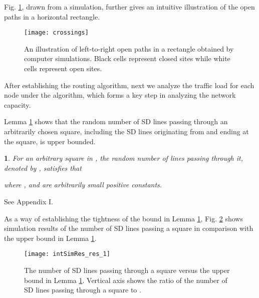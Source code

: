 \documentclass[english]{IEEEtran}
\theoremstyle{plain}
\theoremstyle{plain}
\theoremstyle{plain}
\newtheorem{lem}[thm]{\protect\lemmaname}
\theoremstyle{remark}
\providecommand{\lemmaname}{Lemma}
\begin{document}
Fig. \ref{fig:Open paths}, drawn from a simulation, further gives
an intuitive illustration of the open paths in a horizontal rectangle. 

\begin{figure}
\begin{centering}
\texttt{[image: crossings]}
\par\end{centering}

\protect\caption{\label{fig:Open paths}An illustration of left-to-right open paths
in a rectangle obtained by computer simulations. Black cells represent
closed sites while white cells represent open sites. }


\end{figure}


After establishing the routing algorithm, next we analyze the traffic
load for each node under the algorithm, which forms a key step in
analyzing the network capacity.

Lemma \ref{lem:number of SD lines intersecting any square} shows
that the random number of SD lines passing through an arbitrarily
chosen square, including the SD lines originating from and ending
at the square, is upper bounded. 
\begin{lem}
\label{lem:number of SD lines intersecting any square}For an arbitrary
square in , the random number of  lines passing through
it, denoted by , satisfies that

where ,
 and  are arbitrarily small positive constants.\end{lem}
\begin{IEEEproof}
See Appendix I.
\end{IEEEproof}
As a way of establishing the tightness of the bound in Lemma \ref{lem:number of SD lines intersecting any square},
Fig. \ref{fig:number of SD lines} shows simulation results of the
number of SD lines passing a square in comparison with the upper bound
in Lemma \ref{lem:number of SD lines intersecting any square}. 

\begin{figure}
\begin{centering}
\texttt{[image: intSimRes\_res\_1]}
\par\end{centering}

\protect\caption{\label{fig:number of SD lines}The number of SD lines passing through
a square versus the upper bound in Lemma \ref{lem:number of SD lines intersecting any square}.
Vertical axis shows the ratio of the number of SD lines passing through
a square to .}
\end{figure}
\end{document}
